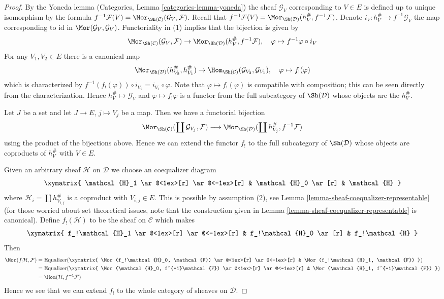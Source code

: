 \begin{proof}
By the Yoneda lemma (Categories, Lemma \ref{categories-lemma-yoneda})
the sheaf $\mathcal{G}_V$ corresponding to $V \in E$
is defined up to unique isomorphism by the formula
$f^{-1}\mathcal{F}(V) = \Mor_{\Sh(\mathcal{C})}(\mathcal{G}_V, \mathcal{F})$.
Recall that
$f^{-1}\mathcal{F}(V) = \Mor_{\Sh(\mathcal{D})}(h_V^\#, f^{-1}\mathcal{F})$.
Denote $i_V : h_V^\# \to f^{-1}\mathcal{G}_V$ the map corresponding to
$\text{id}$ in $\Mor(\mathcal{G}_V, \mathcal{G}_V)$.
Functoriality in (1) implies that the bijection is given by
$$
\Mor_{\Sh(\mathcal{C})}(\mathcal{G}_V, \mathcal{F}) \to
\Mor_{\Sh(\mathcal{D})}(h_V^\#, f^{-1}\mathcal{F}),\quad
\varphi \mapsto f^{-1}\varphi \circ i_V
$$
For any $V_1, V_2 \in E$ there is a canonical map
$$
\Mor_{\Sh(\mathcal{D})}(h^\#_{V_2}, h^\#_{V_1})
\to
\Hom_{\Sh(\mathcal{C})}(\mathcal{G}_{V_2}, \mathcal{G}_{V_1}),\quad
\varphi \mapsto f_!(\varphi)
$$
which is characterized by
$f^{-1}(f_!(\varphi)) \circ i_{V_2} = i_{V_1} \circ \varphi$.
Note that $\varphi \mapsto f_!(\varphi)$ is
compatible with composition; this can be seen directly
from the characterization. Hence $h_V^\# \mapsto \mathcal{G}_V$
and $\varphi \mapsto f_!\varphi$ is a functor from
the full subcategory of $\Sh(\mathcal{D})$ whose objects are the $h_V^\#$.

\medskip\noindent
Let $J$ be a set and let $J \to E$, $j \mapsto V_j$ be a map.
Then we have a functorial bijection
$$
\Mor_{\Sh(\mathcal{C})}(\coprod \mathcal{G}_{V_j}, \mathcal{F})
\longrightarrow
\Mor_{\Sh(\mathcal{D})}(\coprod h_{V_j}^\#, f^{-1}\mathcal{F})
$$
using the product of the bijections above. Hence we can extend the
functor $f_!$ to the full subcategory of $\Sh(\mathcal{D})$ whose
objects are coproducts of $h_V^\#$ with $V \in E$.

\medskip\noindent
Given an arbitrary sheaf $\mathcal{H}$ on $\mathcal{D}$ we choose an
coequalizer diagram
$$
\xymatrix{
\mathcal{H}_1 \ar@<1ex>[r] \ar@<-1ex>[r] &
\mathcal{H}_0 \ar[r] &
\mathcal{H}
}
$$
where $\mathcal{H}_i = \coprod h_{V_{i, j}}^\#$
is a coproduct with $V_{i, j} \in E$.
This is possible by assumption (2), see
Lemma \ref{lemma-sheaf-coequalizer-representable}
(for those worried about set theoretical issues, note that
the construction given in
Lemma \ref{lemma-sheaf-coequalizer-representable} is canonical).
Define $f_!(\mathcal{H})$ to be the sheaf on $\mathcal{C}$
which makes
$$
\xymatrix{
f_!\mathcal{H}_1 \ar@<1ex>[r] \ar@<-1ex>[r] &
f_!\mathcal{H}_0 \ar[r] &
f_!\mathcal{H}
}
$$
Then
\begin{align*}
\Mor(f_!\mathcal{H}, \mathcal{F})
& =
\text{Equalizer}(
\xymatrix{
\Mor(f_!\mathcal{H}_0, \mathcal{F}) \ar@<1ex>[r] \ar@<-1ex>[r] &
\Mor(f_!\mathcal{H}_1, \mathcal{F})
}
) \\
& =
\text{Equalizer}(
\xymatrix{
\Mor(\mathcal{H}_0, f^{-1}\mathcal{F}) \ar@<1ex>[r] \ar@<-1ex>[r] &
\Mor(\mathcal{H}_1, f^{-1}\mathcal{F})
}
) \\
& =
\Hom(\mathcal{H}, f^{-1}\mathcal{F})
\end{align*}
Hence we see that we can extend $f_!$ to the whole category of sheaves
on $\mathcal{D}$.
\end{proof}
